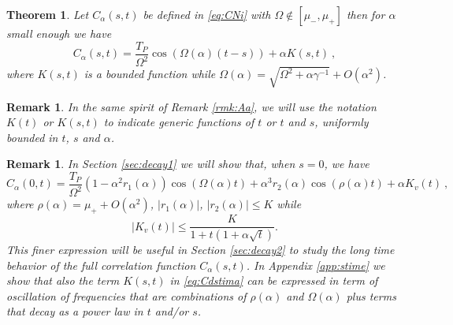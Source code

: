\documentclass[11pt]{article}
\numberwithin{equation}{section}
\newtheorem{theo}{Theorem}
\newtheorem{rmk}[theorem]{Remark}
\numberwithin{theorem}{section}
\begin{document}
\begin{theo}\label{th:outband} Let $C_\alpha(s,t)$ be defined in
\eqref{eq:CNi} with $\Omega\not\in[\mu_-,\mu_+]$ then for $\alpha$ small enough we have
\begin{equation}\label{eq:Cdstima}
 C_\alpha(s,t)=\frac{T_P}{\Omega^2}
\cos(\Omega(\alpha)(t-s))+\alpha K(s,t)\ ,
\end{equation}
where $K(s,t)$ is a bounded function while $\Omega(\alpha)=\sqrt{\Omega^2+\alpha\gamma^{-1}}+O(\alpha^2)$.
\end{theo}

\begin{rmk}\label{rmk:kt}
\emph{In the same spirit of Remark \ref{rmk:Aa}, we will use the notation $K(t)$ or $K(s,t)$ to indicate generic
functions of $t$ or $t$ and $s$, uniformly bounded in $t$, $s$ and $\alpha$. }
\end{rmk}


\begin{rmk}\label{rmk:1time} \emph{In Section \ref{sec:decay1} we will show that, when $s=0$, we have
\begin{equation}\label{eq:C1nr}
C_\alpha(0,t)=\frac{T_P}{\Omega^2}(1-\alpha^2r_1(\alpha))
\cos(\Omega(\alpha)t) +\alpha^3 r_2(\alpha)
\cos(\rho(\alpha)t)+\alpha K_{v}(t)\ ,
\end{equation}
where $\rho(\alpha)=\mu_++O(\alpha^2)$,  $|r_1(\alpha)|$, $|r_2(\alpha)|\leq K$ while
\[
|K_v(t)|\leq\frac{K}{1+t(1+\alpha \sqrt t)}.
\]
This finer expression will be useful in Section \ref{sec:decay2} to study the long time behavior of the full correlation
function $C_\alpha(s,t)$. In Appendix \ref{app:stime} we show that also the term $K(s,t)$ in \eqref{eq:Cdstima} can be
expressed in term of oscillation of frequencies that are combinations of $\rho(\alpha)$ and $\Omega(\alpha)$ plus 
terms that decay as a power law in $t$ and/or $s$.}
\end{rmk}

\end{document}
